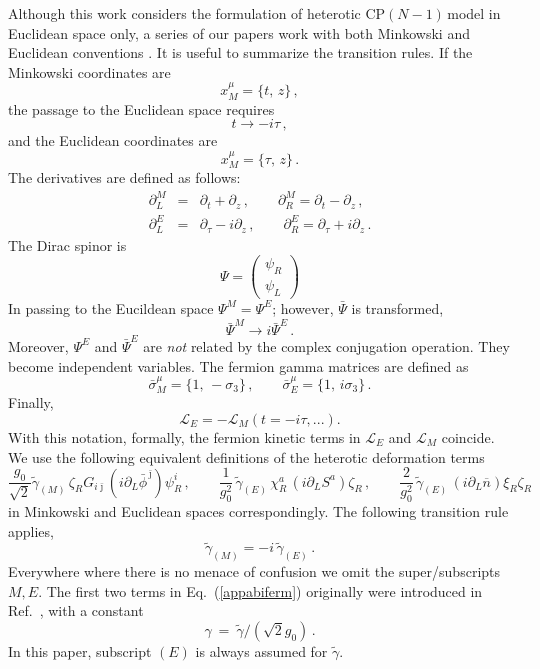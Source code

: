 \documentclass[12pt]{article}
\def\beqn{\begin{eqnarray}}
\def\eeqn{\end{eqnarray}}
\def\beq{\begin{equation}}
\def\eeq{\end{equation}}
\newcommand{\pt}{\partial}
\newcommand{\p}{\partial}
\newcommand{\wt}{\widetilde}
\newcommand{\ov}{\overline}
\newcommand{\ssm}{{\scriptscriptstyle(M)}}
\newcommand{\sse}{{\scriptscriptstyle(E)}}
\newcommand{\cell}{{\mathcal L}}
\newcommand{\cpn}{CP$(N-1)\,$}
\newcommand{\bj}{{\bar \jmath}}
\begin{document}
Although this work considers the formulation of heterotic \cpn model in Euclidean space only, 
a series of our papers work with both Minkowski and Euclidean conventions \cite{SYhet,BSYhet,SYhetlN}.
It is useful to summarize the transition rules.
If the Minkowski coordinates are
\beq
x^\mu_M =\{t,\,z\}\,,
\label{appeone}
\eeq
the passage to the Euclidean space requires
\beq
t \to - i\tau\,,
\label{appe2}
\eeq
and the Euclidean coordinates are
\beq
x^\mu_M =\{\tau,\,z\}\,.
\label{appe3}
\eeq
The derivatives are defined as follows:
\beqn
\pt_L^M &=& \pt_t+\pt_z\,,\qquad \pt_R^M = \pt_t- \pt_z\,,
\nonumber\\[2mm]
\pt_L^E &=& \pt_\tau - i \pt_z\,,\qquad \pt_R^E = \pt_\tau + i \pt_z\,.
\label{appe4}
\eeqn
The Dirac spinor is
\beq
\Psi =\left(
\begin{array}{c}
\psi_R\\[1mm]
\psi_L
\end{array}
\right)
\label{appe5}
\eeq
In passing to the Eucildean space $\Psi^M = \Psi^E$;
however, $\bar\Psi$ is transformed,
\beq
\bar\Psi^M \to i \bar \Psi^E\,.
\label{appe6}
\eeq
Moreover, $\Psi^E$ and $\bar \Psi^E$ are {\em not} related by the complex conjugation operation.
They become independent variables. The fermion gamma matrices are defined as
\beq
\bar\sigma^\mu_M =\{1,\,-\sigma_3\}\,,\qquad \bar\sigma^\mu_E =\{1,\, i\sigma_3\}\,.
\label{appe7}
\eeq
Finally, 
\beq
\cell_E =- \cell_M (t=-i\tau , ...).
\eeq
With this notation, formally, the fermion kinetic terms in $\cell_E $ and $\cell_M $
coincide.
We use the following equivalent definitions of the heterotic deformation terms
\beq
 \frac{g_0}{\sqrt 2} \tilde{\gamma}_\ssm\, \zeta_R G_{i\bj}\left(i\pt_L\bar\phi^{\,\bj}\right)\psi_R^i\,, 
\qquad
  \frac{1}{g_0^2}\, \wt{\gamma}_\sse\, \chi_R^a\, (i\p_L S^a) \zeta_R\,,
\qquad
  \frac{2}{g_0^2}\, \wt{\gamma}_\sse\, (i\p_L \ov{n}) \xi_R \zeta_R\,
\label{appabiferm}
\eeq
in Minkowski and Euclidean spaces correspondingly. 
The following transition rule applies,
\beq
\wt{\gamma}_\ssm = - i\,\wt\gamma_\sse\,.
\label{appe8}
\eeq
Everywhere where there is no menace of confusion we omit the super/sub\-scripts $M,E$.
The first two terms in Eq.~(\ref{appabiferm}) originally were introduced in Ref.~\cite{SYhet}, with 
a constant
\beq
	\gamma ~=~ \wt\gamma / (\sqrt{2}g_0) \,.
\eeq
In this paper, subscript $\scriptstyle (E)$ is always assumed for $\wt\gamma$.
\end{document}
